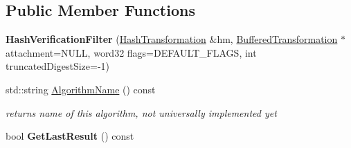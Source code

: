\subsection*{Public Member Functions}
\begin{DoxyCompactItemize}
\item 
\hypertarget{class_hash_verification_filter_a27983e6af704b2f42ec10c76cc70efe0}{
{\bfseries HashVerificationFilter} (\hyperlink{class_hash_transformation}{HashTransformation} \&hm, \hyperlink{class_buffered_transformation}{BufferedTransformation} $\ast$attachment=NULL, word32 flags=DEFAULT\_\-FLAGS, int truncatedDigestSize=-\/1)}
\label{class_hash_verification_filter_a27983e6af704b2f42ec10c76cc70efe0}

\item 
\hypertarget{class_hash_verification_filter_ae306d012c4a01bd48cc77a2b739a037f}{
std::string \hyperlink{class_hash_verification_filter_ae306d012c4a01bd48cc77a2b739a037f}{AlgorithmName} () const }
\label{class_hash_verification_filter_ae306d012c4a01bd48cc77a2b739a037f}

\begin{DoxyCompactList}\small\item\em returns name of this algorithm, not universally implemented yet \item\end{DoxyCompactList}\item 
\hypertarget{class_hash_verification_filter_af292c3d2625a283accedee1f45e84b97}{
bool {\bfseries GetLastResult} () const }
\label{class_hash_verification_filter_af292c3d2625a283accedee1f45e84b97}

\end{DoxyCompactItemize}
